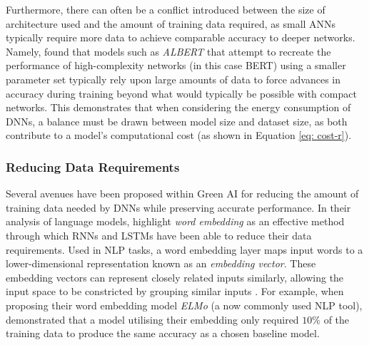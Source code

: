 \documentclass[a4paper, 11pt]{report}
\begin{document}
    Furthermore, there can often be a conflict introduced between the size of architecture used and the amount of training data required, as small ANNs typically require more data to achieve comparable accuracy to deeper networks. Namely, \citet{bender-2021} found that models such as \emph{ALBERT} \citep{lan-2020} that attempt to recreate the performance of high-complexity networks (in this case BERT) using a smaller parameter set typically rely upon large amounts of data to force advances in accuracy during training beyond what would typically be possible with compact networks. This demonstrates that when considering the energy consumption of DNNs, a balance must be drawn between model size and dataset size, as both contribute to a model's computational cost (as shown in Equation \ref{eq: cost-r}).


    \subsubsection{Reducing Data Requirements}

    Several avenues have been proposed within Green AI for reducing the amount of training data needed by DNNs while preserving accurate performance. In their analysis of language models, \citet{bender-2021} highlight \emph{word embedding} as an effective method through which RNNs and LSTMs have been able to reduce their data requirements. Used in NLP tasks, a word embedding layer maps input words to a lower-dimensional representation known as an \emph{embedding vector}. These embedding vectors can represent closely related inputs similarly, allowing the input space to be constricted by grouping similar inputs \citep{bender-2021}. For example, when proposing their word embedding model \emph{ELMo} (a now commonly used NLP tool), \citet{peters-2018} demonstrated that a model utilising their embedding only required $10\%$ of the training data to produce the same accuracy as a chosen baseline model.
\end{document}
